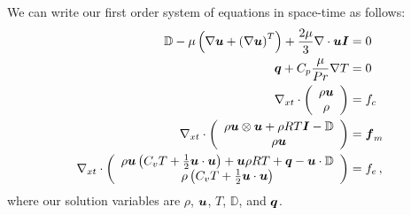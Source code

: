 \documentclass[Proposal.tex]{subfiles}
\begin{document}
We can write our first order system of equations in space-time as follows:
\begin{subequations}
\label{eq:compressibleNSFirstOrder}
\begin{align}
	\mathbb{D}-\mu\left( \nabla\boldsymbol u+\left( \nabla\boldsymbol u \right)^T \right)+\frac{2\mu}{3}\nabla\cdot\boldsymbol u\boldsymbol I&=0\\
	\boldsymbol q+C_p\frac{\mu}{Pr}\nabla T&=0\\
	\nabla_{xt}\cdot\left( \begin{array}{c} \rho\boldsymbol u\\ \rho\\ \end{array} \right)&=f_c\\
	\nabla_{xt}\cdot\left( \begin{array}{c} \rho\boldsymbol u\otimes\boldsymbol u+\rho RT\boldsymbol I-\mathbb{D}\\ \rho\boldsymbol u\\ \end{array} \right)&=\boldsymbol f_m\\
	\nabla_{xt}\cdot\left( \begin{array}{c} \rho\boldsymbol u\left( C_v T+\frac{1}{2}\boldsymbol u\cdot\boldsymbol u \right)+\boldsymbol u\rho RT+\boldsymbol q-\boldsymbol u\cdot\mathbb{D}\\ \rho\left( C_v T+\frac{1}{2}\boldsymbol u\cdot\boldsymbol u \right)\\ \end{array} \right)&=f_e\,,
\end{align}
\end{subequations}
where our solution variables are $\rho$, $\boldsymbol u$, $T$, $\mathbb{D}$, and $\boldsymbol q$.

%                                                                                           
%                                                                                           
%              
\end{document}
